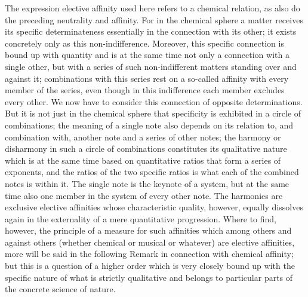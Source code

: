 The expression elective affinity used here
refers to a chemical relation,
as also do the preceding neutrality and affinity.
For in the chemical sphere a matter
receives its specific determinateness
essentially in the connection with its other;
it exists concretely only as this non-indifference.
Moreover, this specific connection is bound up with quantity
and is at the same time not only a connection with a single other,
but with a series of such non-indifferent matters
standing over and against it;
combinations with this series rest on a so-called affinity
with every member of the series,
even though in this indifference each member excludes every other.
We now have to consider this connection of opposite determinations.
But it is not just in the chemical sphere that specificity is
exhibited in a circle of combinations;
the meaning of a single note also depends on its relation to,
and combination with, another note and a series of other notes;
the harmony or disharmony in such a circle of combinations
constitutes its qualitative nature
which is at the same time based on quantitative ratios
that form a series of exponents,
and the ratios of the two specific ratios is
what each of the combined notes is within it.
The single note is the keynote of a system,
but at the same time also one member in
the system of every other note.
The harmonies are exclusive elective affinities
whose characteristic quality, however,
equally dissolves again in the externality of
a mere quantitative progression.
Where to find, however, the principle of a measure
for such affinities which among others and against others
(whether chemical or musical or whatever)
are elective affinities,
more will be said in the following Remark
in connection with chemical affinity;
but this is a question of a higher order
which is very closely bound up with
the specific nature of what is strictly qualitative
and belongs to particular parts of the concrete science of nature.

